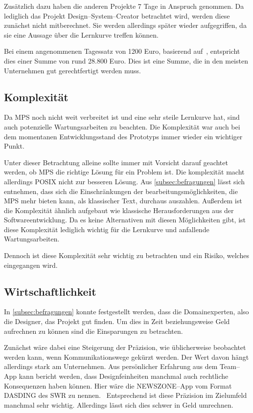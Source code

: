 Zusätzlich dazu haben die anderen Projekte 7 Tage in Anspruch genommen.
Da lediglich das Projekt Design--System--Creator betrachtet wird, werden diese zunächst nicht mitberechnet.
Sie werden allerdings später wieder aufgegriffen, da sie eine Aussage über die Lernkurve treffen können.

Bei einem angenommenen Tagessatz von 1200 Euro, basierend auf~\cite{metrics-germany-gmbh-2021}, entspricht dies einer Summe von rund 28.800 Euro.
Dies ist eine Summe, die in den meisten Unternehmen gut gerechtfertigt werden muss.

\subsection{Komplexität}\label{subsec:komplexitat}
Da \ac{MPS} noch nicht weit verbreitet ist und eine sehr steile Lernkurve hat, sind auch potenzielle Wartungsarbeiten zu beachten.
Die Komplexität war auch bei dem momentanen Entwicklungsstand des Prototyps immer wieder ein wichtiger Punkt.

Unter dieser Betrachtung alleine sollte immer mit Vorsicht darauf geachtet werden, ob \ac{MPS} die richtige Lösung für ein Problem ist.
Die komplexität macht allerdings \ac{POSIX} nicht zur besseren Lösung.
Aus \autoref{subsec:befragungen} lässt sich entnehmen, dass sich die Einschränkungen der bearbeitungsmöglichkeiten, die \ac{MPS} mehr bieten kann, als klassischer Text, durchaus auszahlen.
Außerdem ist die Komplexität ähnlich aufgebaut wie klassische Herausforderungen aus der Softwareentwicklung.
Da es keine Alternativen mit diesen Möglichkeiten gibt, ist diese Komplexität lediglich wichtig für die Lernkurve und anfallende Wartungsarbeiten.

Dennoch ist diese Komplexität sehr wichtig zu betrachten und ein Risiko, welches eingegangen wird.

\subsection{Wirtschaftlichkeit}\label{subsec:wirtschaftlichkeit}
In \autoref{subsec:befragungen} konnte festgestellt werden, dass die Domainexperten, also die Designer, das Projekt gut finden.
Um dies in Zeit beziehungsweise Geld aufrechnen zu können sind die Einsparungen zu betrachten.

Zunächst wäre dabei eine Steigerung der Präzision, wie üblicherweise beobachtet werden kann, wenn Kommunikationswege gekürzt werden.
Der Wert davon hängt allerdings stark am Unternehmen.
Aus persönlicher Erfahrung aus dem Team--App kann bericht werden, dass Designfeinheiten manchmal auch rechtliche Konsequenzen haben können.
Hier wäre die NEWSZONE--App vom Format DASDING des \ac{SWR} zu nennen.~\autocite{suddeutsche-zeitung-2022}
Entsprechend ist diese Präzision im Zielumfeld manchmal sehr wichtig.
Allerdings lässt sich dies schwer in Geld umrechnen.

